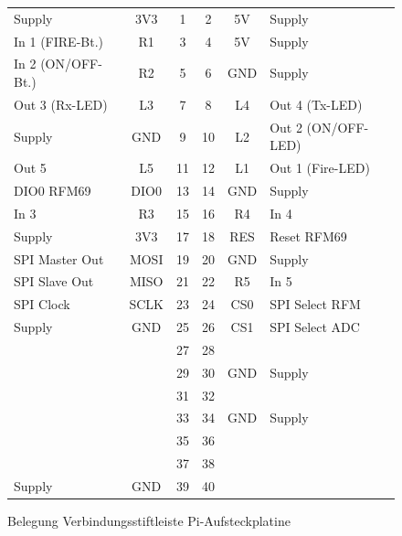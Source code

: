 \documentclass[paper=a4, parskip, numbers=noenddot, toc=listof, headsepline]{scrbook}
\begin{document}
			\begin{figure}
				\centering
				\begin{tabu}
					to \textwidth {Xc|cc|cX}
					Supply            & 3V3  & 1  & 2  & 5V  & Supply             \\
					In 1 (FIRE-Bt.)   & R1   & 3  & 4  & 5V  & Supply             \\
					In 2 (ON/OFF-Bt.) & R2   & 5  & 6  & GND & Supply             \\
					Out 3 (Rx-LED)    & L3   & 7  & 8  & L4  & Out 4 (Tx-LED)     \\
					Supply            & GND  & 9  & 10 & L2  & Out 2 (ON/OFF-LED) \\
					Out 5             & L5   & 11 & 12 & L1  & Out 1 (Fire-LED)   \\
					DIO0 RFM69        & DIO0 & 13 & 14 & GND & Supply             \\
					In 3              & R3   & 15 & 16 & R4  & In 4               \\
					Supply            & 3V3  & 17 & 18 & RES & Reset RFM69        \\
					SPI Master Out    & MOSI & 19 & 20 & GND & Supply             \\
					SPI Slave Out     & MISO & 21 & 22 & R5  & In 5               \\
					SPI Clock         & SCLK & 23 & 24 & CS0 & SPI Select RFM     \\
					Supply            & GND  & 25 & 26 & CS1 & SPI Select ADC     \\
					~                 &      & 27 & 28 &     &                    \\
					~                 &      & 29 & 30 & GND & Supply             \\
					~                 &      & 31 & 32 &     &                    \\
					~                 &      & 33 & 34 & GND & Supply             \\
					~                 &      & 35 & 36 &     &                    \\
					~                 &      & 37 & 38 &     &                    \\
					Supply            & GND  & 39 & 40 &     &                    \\ 
				\end{tabu}
				\caption{Belegung Verbindungsstiftleiste Pi-Aufsteckplatine}
				\label{fig:piheader}
			\end{figure}
\end{document}
